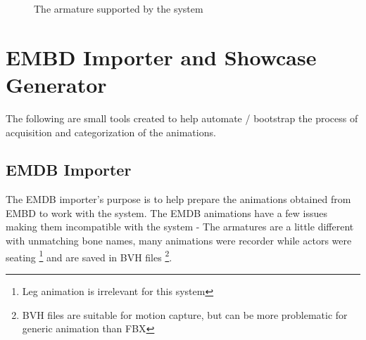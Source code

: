 \begin{figure}[!ht]
\centerline{}
\caption{The armature supported by the system}\label{fig:armature}
\end{figure}


\section{EMBD Importer and Showcase Generator}
The following are small tools created to help automate / bootstrap the process of acquisition and categorization of the animations.


\subsection{EMDB Importer}
The EMDB importer's purpose is to help prepare the animations obtained from EMBD to work with the system. The EMDB animations have a few issues making them incompatible with the system - The armatures are a little different with unmatching bone names, many animations were recorder while actors were seating \footnote{Leg animation is irrelevant for this system} and are saved in BVH files \footnote{BVH files are suitable for motion capture, but can be more problematic for generic animation than FBX}.

